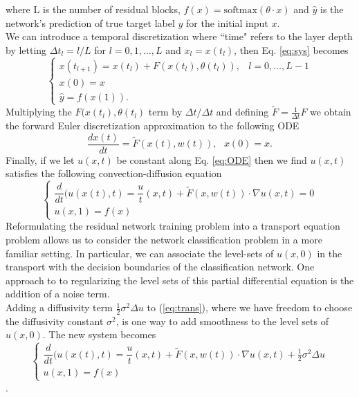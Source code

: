 \documentclass[12pt]{article}
\begin{document}
where L is the number of residual blocks, $f(x) = \text{softmax}(\theta \cdot x)$ and $\hat y$ is the network's prediction of true target label $y$ for the initial input $x$. \\
\indent We can introduce a temporal discretization where ``time" refers to the layer depth by letting $\Delta t_l = l/L$ for $l=0,1,\dots,L$ and $x_l = x(t_l)$, then Eq. \ref{eq:sys} becomes
\begin{equation} \begin{cases}
x(t_{l+1}) = x(t_l) + F(x(t_l),\theta(t_l)), & l=0,\dots,L-1 \\
x(0) = x \\
\hat y = f(x(1)).
\end{cases} \end{equation}
Multiplying the $F(x(t_l),\theta(t_l)$ term by $\Delta t/\Delta t$ and defining $\tilde{F} = \frac{1}{\Delta t} F$ we obtain the forward Euler discretization approximation to the following ODE
\begin{equation}
  \dfrac{dx(t)}{dt} = \tilde{F}(x(t),w(t)),\text{   }  x(0) = x.
  \label{eq:ODE}
\end{equation}
Finally, if we let $u(x,t)$ be constant along Eq. \ref{eq:ODE} then we find  $u(x,t)$ satisfies the following convection-diffusion equation
\begin{equation}
  \begin{cases}
  \dfrac{d}{dt}(u(x(t),t) = \dfrac{u}{t}(x,t) + \tilde{F}(x,w(t))\cdot\nabla u(x,t) = 0 \\
  u(x,1) = f(x)
\end{cases}
  \label{eq:trans}
\end{equation}
\indent Reformulating the residual network training problem into a transport equation problem allows us to consider the network classification problem in a more familiar setting. In particular, we can associate the level-sets of $u(x,0)$ in the transport with the decision boundaries of the classification network. One approach to to regularizing the level sets of this partial differential equation is the addition of a noise term. \\
\indent Adding a diffusivity term $\frac{1}{2}\sigma^2\Delta u$ to (\ref{eq:trans}), where we have freedom to choose the diffusivity constant $\sigma^2$, is one way to add smoothness to the level sets of $u(x,0)$. The new system becomes
  \begin{equation}
    \begin{cases}
    \dfrac{d}{dt}(u(x(t),t) = \dfrac{u}{t}(x,t) + \tilde{F}(x,w(t))\cdot\nabla u(x,t) + \frac{1}{2}\sigma^2\Delta u \\
    u(x,1) = f(x)
  \end{cases}
  \label{eq:cd}
\end{equation}.
\end{document}
